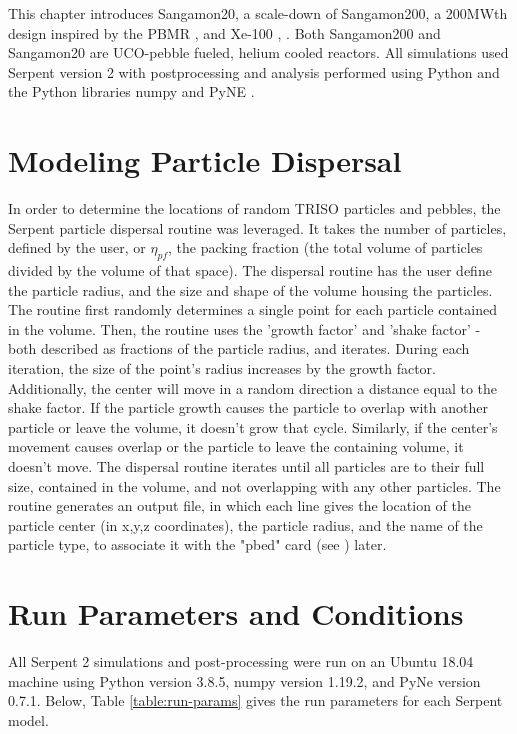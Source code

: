This chapter introduces Sangamon20, a scale-down of Sangamon200, a 200MWth design inspired by the PBMR \cite{venter_pbmr_2005}, \cite{noauthor_pebble_2017} and Xe-100 \cite{harlan_ans_2017}, \cite{harlan_x-energy_2018}.  Both Sangamon200 and Sangamon20 are UCO-pebble fueled, helium cooled reactors.  All simulations used Serpent version 2 \cite{leppanenjaakko_serpent_2015} with postprocessing and analysis performed using Python \cite{van_rossum_python_nodate} and the Python libraries numpy \cite{harris_array_2020} and PyNE \cite{scopatz_pyne:_2012}.  

\section{Modeling Particle Dispersal}
In order to determine the locations of random TRISO particles and pebbles, the Serpent particle dispersal routine was leveraged.  It takes the number of particles, defined by the user, or $\eta_{pf}$, the packing fraction (the total volume of particles divided by the volume of that space).  The dispersal routine has the user define the particle radius, and the size and shape of the volume housing the particles.  The routine first randomly determines a single point for each particle contained in the volume.  Then, the routine uses the 'growth factor' and 'shake factor' - both described as fractions of the particle radius, and iterates.  During each iteration, the size of the point's radius increases by the growth factor.  Additionally, the center will move in a random direction a distance equal to the shake factor.  If the particle growth causes the particle to overlap with another particle or leave the volume, it doesn't grow that cycle.  Similarly, if the center's movement causes overlap or the particle to leave the containing volume, it doesn't move.  The dispersal routine iterates until all particles are to their full size, contained in the volume, and not overlapping with any other particles.  The routine generates an output file, in which each line gives the location of the particle center (in x,y,z coordinates), the particle radius, and the name of the particle type, to associate it with the "pbed" card (see \cite{leppanenjaakko_serpent_2015}) later.

\section{Run Parameters and Conditions}

All Serpent 2 simulations and post-processing were run on an Ubuntu 18.04 machine using Python version 3.8.5, numpy version 1.19.2, and PyNe version 0.7.1.  Below, Table \ref{table:run-params} gives the run parameters for each Serpent model.

